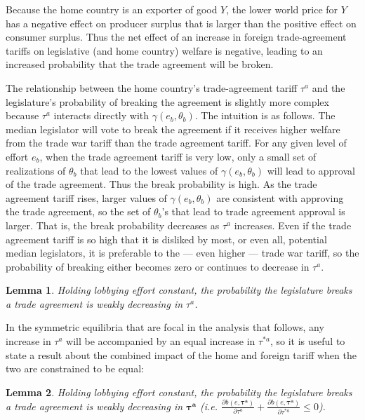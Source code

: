 \documentclass[10pt]{article}
\newtheorem{lemma}{Lemma}
\newcommand{\ta}{\theta}
\newcommand{\bta}{\bm{\tau^a}}
\newcommand{\ga}{\gamma}
\begin{document}
Because the home country is an exporter of good $Y$, the lower world price for $Y$ has a negative effect on producer surplus that is larger than the positive effect on consumer surplus. Thus the net effect of an increase in foreign trade-agreement tariffs on legislative (and home country) welfare is negative, leading to an increased probability that the trade agreement will be broken.

The relationship between the home country's trade-agreement tariff $\tau^a$ and the legislature's probability of breaking the agreement is slightly more complex because $\tau^a$ interacts directly with $\ga(e_b,\ta_b)$. The intuition is as follows. The median legislator will vote to break the agreement if it receives higher welfare from the trade war tariff than the trade agreement tariff. For any given level of effort $e_b$, when the trade agreement tariff is very low, only a small set of realizations of $\ta_b$ that lead to the lowest values of $\ga(e_b,\ta_b)$ will lead to approval of the trade agreement. Thus the break probability is high. As the trade agreement tariff rises, larger values of $\ga(e_b,\ta_b)$ are consistent with approving the trade agreement, so the set of $\ta_b$'s that lead to trade agreement approval is larger. That is, the break probability decreases as $\tau^a$ increases. Even if the trade agreement tariff is so high that it is disliked by most, or even all, potential median legislators, it is preferable to the --- even higher --- trade war tariff, so the probability of breaking either becomes zero or continues to decrease in $\tau^a$.

\begin{lemma}
  Holding lobbying effort constant, the probability the legislature breaks a trade agreement is weakly decreasing in $\tau^a$.
  \label{res:leg_a}
\end{lemma}

In the symmetric equilibria that are focal in the analysis that follows, any increase in $\tau^a$ will be accompanied by an equal increase in $\tau^{*a}$, so it is useful to state a result about the combined impact of the home and foreign tariff when the two are constrained to be equal:
\begin{lemma}
	Holding lobbying effort constant, the probability the legislature breaks a trade agreement is weakly decreasing in $\bta$ (i.e. $\frac{\partial b(e,\bta)}{\partial  \tau^a} + \frac{\partial b(e,\bta)}{\partial  \tau^{*a}} \leq 0$).
	\label{res:bcomb}
\end{lemma}
\end{document}
